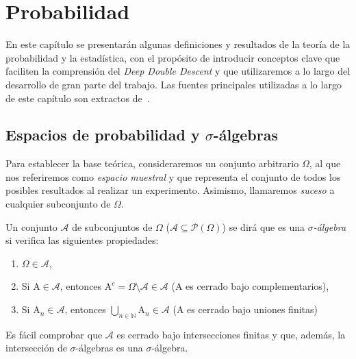 
\chapter{Probabilidad}\label{ch:capitulo-teoria-de-la-probabilidad}

En este capítulo se presentarán algunas definiciones y resultados de la teoría de la probabilidad y la estadística, con el propósito de introducir conceptos clave que faciliten la comprensión del \textit{Deep Double Descent} y que utilizaremos a lo largo del desarrollo de gran parte del trabajo. Las fuentes principales utilizadas a lo largo de este capítulo son extractos de~\cite{Dembo2014, Knill2009}.

\section{Espacios de probabilidad y $\sigma$-álgebras}

Para establecer la base teórica, consideraremos un conjunto arbitrario $\Omega$, al que nos referiremos como \emph{espacio muestral} y que representa el conjunto de todos los posibles resultados al realizar un experimento. Asimismo, llamaremos \emph{suceso} a cualquier subconjunto de $\Omega$.\newline

\begin{definicion}\label{def:sigma-algebra}
    Un conjunto $\mathcal{A}$ de subconjuntos de $\Omega$ ($\mathcal{A} \subseteq \mathcal{P}(\Omega)$) se dirá que es una \emph{$\sigma$-álgebra} si verifica las siguientes propiedades:

    \begin{enumerate}
        \item $\Omega \in \mathcal{A}$,
        \item Si $\mathrm{A} \in \mathcal{A}$, entonces $\mathrm{A}^c = \Omega \setminus \mathcal{A} \in \mathcal{A}$ ($\mathrm{A}$ es cerrado bajo complementarios),
        \item Si $\mathrm{A}_{n} \in \mathcal{A}$, entonces $\bigcup_{n \in \mathbb{N}} \mathrm{A}_{n} \in \mathcal{A}$ (A es cerrado bajo uniones finitas)
    \end{enumerate}
\end{definicion}

Es fácil comprobar que $\mathcal{A}$ es cerrado bajo intersecciones finitas y que, además, la intersección de $\sigma$-álgebras es una $\sigma$-álgebra.\newline

